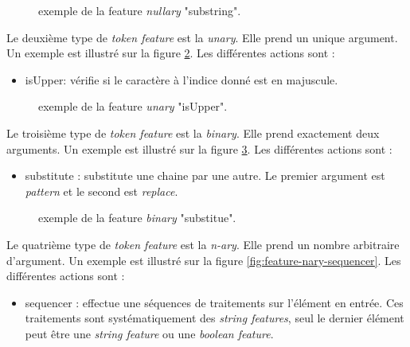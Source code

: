 \documentclass[manual-fr.tex]{subfiles}
\begin{document}
\begin{figure}[ht!]
\footnotesize
\begin{xml}
\end{xml}
\caption{exemple de la feature \textit{nullary} "substring".}
\label{fig:feature-nullary-substring}
\end{figure}

Le deuxième type de \textit{token feature} est la \textit{unary}. Elle prend un unique argument. Un exemple est illustré sur la figure \ref{fig:feature-unary-isUpper}. Les différentes actions sont :
\begin{itemize}
    \item isUpper: vérifie si le caractère à l'indice donné est en majuscule.
\end{itemize}

\begin{figure}[ht!]
\footnotesize
\begin{xml}
\end{xml}
\caption{exemple de la feature \textit{unary} "isUpper".}
\label{fig:feature-unary-isUpper}
\end{figure}

Le troisième type de \textit{token feature} est la \textit{binary}. Elle prend exactement deux arguments. Un exemple est illustré sur la figure \ref{fig:feature-binary-substitute}. Les différentes actions sont :
\begin{itemize}
    \item substitute : substitute une chaine par une autre. Le premier argument est \textit{pattern} et le second est \textit{replace}.
\end{itemize}

\begin{figure}[ht!]
\footnotesize
\begin{xml}
\end{xml}
\caption{exemple de la feature \textit{binary} "substitue".}
\label{fig:feature-binary-substitute}
\end{figure}

Le quatrième type de \textit{token feature} est la \textit{n-ary}. Elle prend un nombre arbitraire d'argument. Un exemple est illustré sur la figure \ref{fig:feature-nary-sequencer}. Les différentes actions sont :
\begin{itemize}
    \item sequencer : effectue une séquences de traitements sur l'élément en entrée. Ces traitements sont systématiquement des \textit{string features}, seul le dernier élément peut être une \textit{string feature} ou une \textit{boolean feature}.
\end{itemize}
\end{document}
